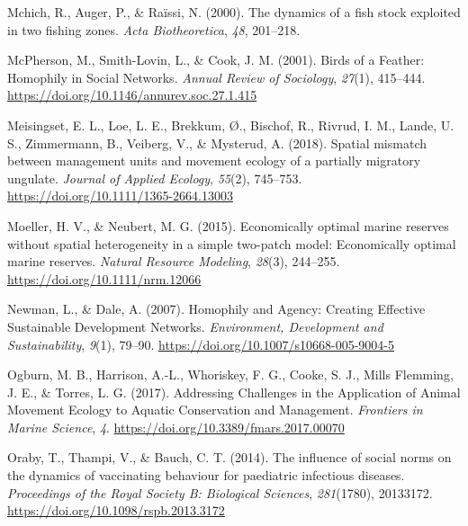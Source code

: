 \documentclass[
  12pt,
]{article}
\newlength{\cslhangindent}
\newlength{\cslentryspacingunit} %
\newenvironment{CSLReferences}[2] %
 {%
  \setlength{\parindent}{0pt}
  \ifodd #1
  \let\oldpar\par
  \def\par{\hangindent=\cslhangindent\oldpar}
  \fi
  \setlength{\parskip}{#2\cslentryspacingunit}
 }%
 {}
\begin{document}
\begin{CSLReferences}{1}{2}
\leavevmode{}%
Mchich, R., Auger, P., \& Raïssi, N. (2000). The dynamics of a fish stock exploited in two fishing zones. \emph{Acta Biotheoretica}, \emph{48}, 201--218.

\leavevmode{}%
McPherson, M., Smith-Lovin, L., \& Cook, J. M. (2001). Birds of a {Feather}: {Homophily} in {Social Networks}. \emph{Annual Review of Sociology}, \emph{27}(1), 415--444. \url{https://doi.org/10.1146/annurev.soc.27.1.415}

\leavevmode{}%
Meisingset, E. L., Loe, L. E., Brekkum, Ø., Bischof, R., Rivrud, I. M., Lande, U. S., Zimmermann, B., Veiberg, V., \& Mysterud, A. (2018). Spatial mismatch between management units and movement ecology of a partially migratory ungulate. \emph{Journal of Applied Ecology}, \emph{55}(2), 745--753. \url{https://doi.org/10.1111/1365-2664.13003}

\leavevmode{}%
Moeller, H. V., \& Neubert, M. G. (2015). Economically optimal marine reserves without spatial heterogeneity in a simple two-patch model: {Economically} optimal marine reserves. \emph{Natural Resource Modeling}, \emph{28}(3), 244--255. \url{https://doi.org/10.1111/nrm.12066}

\leavevmode{}%
Newman, L., \& Dale, A. (2007). Homophily and {Agency}: {Creating Effective Sustainable Development Networks}. \emph{Environment, Development and Sustainability}, \emph{9}(1), 79--90. \url{https://doi.org/10.1007/s10668-005-9004-5}

\leavevmode{}%
Ogburn, M. B., Harrison, A.-L., Whoriskey, F. G., Cooke, S. J., Mills Flemming, J. E., \& Torres, L. G. (2017). Addressing {Challenges} in the {Application} of {Animal Movement Ecology} to {Aquatic Conservation} and {Management}. \emph{Frontiers in Marine Science}, \emph{4}. \url{https://doi.org/10.3389/fmars.2017.00070}

\leavevmode{}%
Oraby, T., Thampi, V., \& Bauch, C. T. (2014). The influence of social norms on the dynamics of vaccinating behaviour for paediatric infectious diseases. \emph{Proceedings of the Royal Society B: Biological Sciences}, \emph{281}(1780), 20133172. \url{https://doi.org/10.1098/rspb.2013.3172}


\end{CSLReferences}
\end{document}
